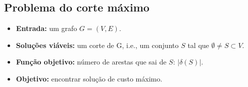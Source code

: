 \subsection{Problema do corte máximo}

\begin{itemize}
    \item \textbf{Entrada:} um grafo $G=(V, E)$.
    \item \textbf{Soluções viáveis:} um corte de G, i.e., um conjunto $S$ tal que $\emptyset \neq S \subset V$.
    \item \textbf{Função objetivo:} número de arestas que sai de $S$: $|\delta (S)|$.
    \item \textbf{Objetivo:} encontrar solução de custo máximo.
\end{itemize}

\begin{algorithm}
    \SetAlgoLined
\end{algorithm}

